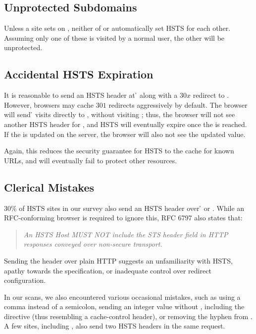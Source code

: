 \documentclass{acm_proc_article-sp}
\begin{document}
{\subsection{Unprotected Subdomains}

Unless a site sets {\iSD} on {\s}, neither of {\s} or {\sw} automatically set HSTS for each other. Assuming only one of these is visited by a normal user, the other will be unprotected.

\subsection{Accidental HSTS Expiration}

It is reasonable to send an HSTS header at {\h} along with a $30x$ redirect to {\sw}. However, browsers may cache $301$ redirects  aggressively by default. The browser will send {\h} visits directly to {\sw}, without visiting {\s}; thus, the browser will not see another HSTS header for {\s}, and HSTS will eventually expire once the {\ma} is reached. If the {\ma} is updated on the server, the browser will also not see the updated value.

Again, this reduces the security guarantee for HSTS to the cache for known URLs, and will eventually fail to protect other resources.

\subsection{Clerical Mistakes}

$30\%$ of HSTS sites in our survey also send an HSTS header over {\h} or {\hw}. While an RFC-conforming browser is required to ignore this, RFC 6797\cite{rfc} also states that:

\begin{quotation}\it
An HSTS Host MUST NOT include the STS header field in HTTP responses conveyed over non-secure transport.
\end{quotation}

Sending the header over plain HTTP suggests an unfamiliarity with HSTS, apathy towards the specification, or inadequate control over redirect configuration.

In our scans, we also encountered various occasional mistakes, such as using a comma instead of a semicolon, sending an integer value without , including the  directive (thus resembling a cache-control header), or removing the hyphen from . A few sites, including , also send two HSTS headers in the same request.

}
\end{document}
